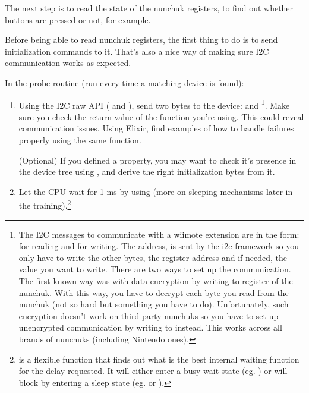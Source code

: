 The next step is to read the state of the nunchuk registers, to find out
whether buttons are pressed or not, for example.

Before being able to read nunchuk registers, the first thing to do is
to send initialization commands to it. That's also a nice way of making
sure I2C communication works as expected.

In the probe routine (run every time a matching device is found):

\begin{enumerate}
\item Using the I2C raw API ( and
        ), send two bytes to the
        device:  and \footnote{
	The I2C messages to communicate with a wiimote
        extension are in the form: 
        for reading and  for
        writing. The address,  is sent by the i2c framework
        so you only have to write the other bytes, the register
        address and if needed, the value you want to write. There are
        two ways to set up the communication. The first known way was
        with data encryption by writing  to register
         of the nunchuk.  With this way, you have to
        decrypt each byte you read from the nunchuk (not so hard but
        something you have to do).  Unfortunately, such encryption
        doesn't work on third party nunchuks so you have to set up
        unencrypted communication by writing  to
         instead. This works across all brands of nunchuks
        (including Nintendo ones).}.
      Make sure you check the return value of the function you're
      using. This could reveal communication issues.  Using Elixir, find
      examples of how to handle failures properly using the same
      function.

      (Optional) If you defined a 
      property, you may want to check it's presence in the device tree
      using , and derive the right
      initialization bytes from it.

\item Let the CPU wait for 1 ms by using  (more on sleeping
      mechanisms later in the training).\footnote{ is a flexible
      function that finds out what is the best internal waiting function for the
      delay requested. It will either enter a busy-wait state
      (eg. ) or will block by entering a sleep state
      (eg.  or ).

}
\end{enumerate}
